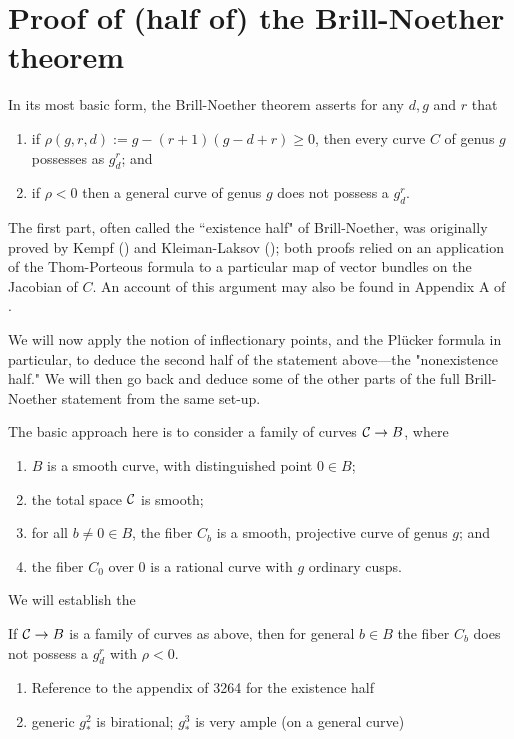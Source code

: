 \section{Proof of (half of) the Brill-Noether theorem}

In its most basic form, the Brill-Noether theorem asserts for any $d, g$ and $r$ that
\begin{enumerate}
\item if $\rho(g,r,d) := g - (r+1)(g-d+r) \geq 0$, then every curve $C$ of genus $g$ possesses as $g^r_d$; and
\item if $\rho < 0$ then a general curve of genus $g$ does not possess a $g^r_d$.
\end{enumerate}

The first part, often called the ``existence half" of Brill-Noether, was originally proved by Kempf (\cite{}) and Kleiman-Laksov (\cite{}); both proofs relied on an application of the Thom-Porteous formula to a particular map of vector bundles on the Jacobian of $C$. An account of this argument may also be found in Appendix A of \cite{}. 

We will now apply the notion of inflectionary points, and the Pl\"ucker formula in particular, to deduce the second half of the statement above---the "nonexistence half." We will then go back and deduce some of the other parts of the full Brill-Noether statement from the same set-up.

The basic approach here is to consider a family of curves $\cC \to B$, where
\begin{enumerate}
\item $B$ is a smooth curve, with distinguished point $0 \in B$;
\item the total space $\cC$ is smooth;
\item for all $b \neq 0 \in B$, the fiber $C_b$ is a smooth, projective curve of genus $g$;  and
\item the fiber $C_0$ over $0$ is a rational curve with $g$ ordinary cusps.
\end{enumerate}

We will establish the

\begin{theorem}
If $\cC \to B$ is a family of curves as above, then for general $b \in B$ the fiber $C_b$ does not possess a $g^r_d$ with $\rho < 0$.
\end{theorem}




\begin{enumerate}
 
\item Reference to the appendix of 3264 for the existence half
\item generic $g^2_*$ is birational; $g^3_*$ is very ample (on a general curve)
\end{enumerate}
